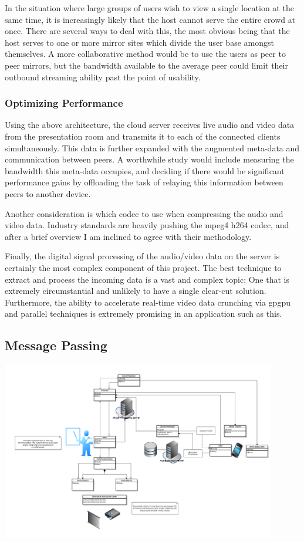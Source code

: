 \documentclass[a4paper,12pt]{report}
\begin{document}
In the situation where large groups of users wish to view a single location at the same time, it is increasingly likely that the host cannot serve the entire crowd at once. There are several ways to deal with this, the most obvious being that the host serves to one or more mirror sites which divide the user base amongst themselves. A more collaborative method would be to use the users as peer to peer mirrors, but the bandwidth available to the average peer could limit their outbound streaming ability past the point of usability.

	\subsubsection{Optimizing Performance}
Using the above architecture, the cloud server receives live audio and video data from the presentation room and transmits it to each of the connected clients simultaneously. This data is further expanded with the augmented meta-data and communication between peers. A worthwhile study would include measuring the bandwidth this meta-data occupies, and deciding if there would be significant performance gains by offloading the task of relaying this information between peers to another device.

Another consideration is which codec to use when compressing the audio and video data. Industry standards are heavily pushing the mpeg4 h264 codec, and after a brief overview I am inclined to agree with their methodology.

Finally, the digital signal processing of the audio/video data on the server is certainly the most complex component of this project. The best technique to extract and process the incoming data is a vast and complex topic; One that is extremely circumstantial and unlikely to have a single clear-cut solution. Furthermore, the ability to accelerate real-time video data crunching via gpgpu and parallel techniques is extremely promising in an application such as this.

\subsection{Message Passing}
\includegraphics[width=12cm]{blockDiagram}
\end{document}
